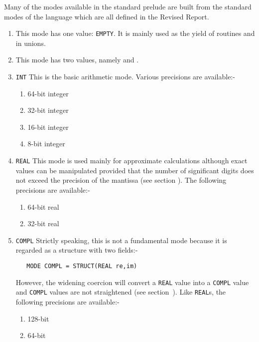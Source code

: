 Many of the modes available in the standard prelude are built from the
standard modes of the language which are all defined in the Revised
Report.
\begin{enumerate}
\item {} \newline
This mode has one value: \verb|EMPTY|. It is mainly used as the yield
of routines and in unions.
\item {} \newline
 This mode has
two values, namely  and
.
\item \verb|INT| \newline
This is the basic arithmetic mode. Various precisions are available:-
\begin{enumerate}
\item {} 64-bit integer
\item {} 32-bit integer
\item {} 16-bit integer
\item {} 8-bit integer
\end{enumerate}
\item \verb|REAL|\newline
This mode is used mainly for approximate calculations although exact
values can be manipulated provided that the number of significant
digits does not exceed the precision of the mantissa (see section
). The following precisions are available:-
\begin{enumerate}
\item {} 64-bit real
\item {} 32-bit real
\end{enumerate}
\item \verb|COMPL| \newline
Strictly speaking, this is not a fundamental mode because it is
regarded as a structure with two fields:-
\begin{verbatim}
   MODE COMPL = STRUCT(REAL re,im)
\end{verbatim}
\noindent
However, the widening coercion will convert a \verb|REAL| value into a
\verb|COMPL| value and \verb|COMPL| values are not straightened (see
section~). Like \verb|REAL|s, the following
precisions are available:-
\begin{enumerate}
\item {} 128-bit
\item {} 64-bit

\end{enumerate}
\end{enumerate}
